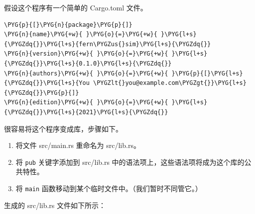 假设这个程序有一个简单的 Cargo.toml 文件。

\begin{Verbatim}[commandchars=\\\{\},breaklines=true,breakanywhere=true,fontsize=\codefont,xleftmargin=17bp]
\PYG{p}{[}\PYG{n}{package}\PYG{p}{]}
\PYG{n}{name}\PYG{+w}{ }\PYG{o}{=}\PYG{+w}{ }\PYG{l+s}{\PYGZdq{}}\PYG{l+s}{fern\PYGZus{}sim}\PYG{l+s}{\PYGZdq{}}
\PYG{n}{version}\PYG{+w}{ }\PYG{o}{=}\PYG{+w}{ }\PYG{l+s}{\PYGZdq{}}\PYG{l+s}{0.1.0}\PYG{l+s}{\PYGZdq{}}
\PYG{n}{authors}\PYG{+w}{ }\PYG{o}{=}\PYG{+w}{ }\PYG{p}{[}\PYG{l+s}{\PYGZdq{}}\PYG{l+s}{You \PYGZlt{}you@example.com\PYGZgt{}}\PYG{l+s}{\PYGZdq{}}\PYG{p}{]}
\PYG{n}{edition}\PYG{+w}{ }\PYG{o}{=}\PYG{+w}{ }\PYG{l+s}{\PYGZdq{}}\PYG{l+s}{2021}\PYG{l+s}{\PYGZdq{}}
\end{Verbatim}

很容易将这个程序变成库，步骤如下。

\begin{enumerate}
\item 将文件 src/main.rs 重命名为 src/lib.rs。
\item 将 \texttt{pub} 关键字添加到 src/lib.rs 中的语法项上，这些语法项将成为这个库的公共特性。
\item 将 \texttt{main} 函数移动到某个临时文件中。（我们暂时不同管它。）
\end{enumerate}

生成的 src/lib.rs 文件如下所示：

